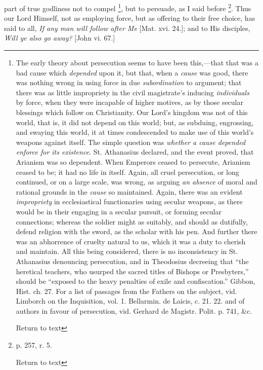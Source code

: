 part of true godliness not to compel \footnote{The early theory about persecution seems to
have been this,—that that was a bad cause which \emph{depended} upon
it, but that, when a \emph{cause} was good, there was nothing wrong in
using force in due \emph{subordination} to argument; that there was as
little impropriety in the civil magistrate's inducing \emph{individuals}
by force, when they were incapable of higher motives, as by those
secular blessings which follow on Christianity. Our Lord's kingdom was
not of this world, that is, it did not depend on this world; but, as
subduing, engrossing, and swaying this world, it at times condescended
to make use of this world's weapons against itself. The simple
question was \emph{whether a cause depended enforce for its existence}.
St. Athanasius declared, and the event proved, that Arianism was so
dependent. When Emperors ceased to persecute, Arianism ceased to be;
it had no life in itself. Again, all cruel persecution, or long
continued, or on a large scale, was wrong, as arguing \emph{an absence}
of moral and rational grounds in the \emph{cause} so maintained.
Again, there was an evident \emph{impropriety} in ecclesiastical
functionaries using secular weapons, as there would be in their
engaging in a secular pursuit, or forming secular connections; whereas
the soldier might as suitably, and should as dutifully, defend
religion with the sword, as the scholar with his pen. And further
there was an abhorrence of cruelty natural to us, which it was a duty
to cherish and maintain. All this being considered, there is no
inconsistency in St. Athanasius denouncing persecution, and in
Theodosius decreeing that ``the heretical teachers, who usurped the
sacred titles of Bishops or Presbyters,'' should be ``exposed to the
heavy penalties of exile and confiscation.'' Gibbon, Hist. ch. 27. For
a list of passages from the Fathers on the subject, vid. Limborch on
the Inquisition, vol. 1. Bellarmin. de Laicis, c. 21. 22. and of
authors in favour of persecution, vid. Gerhard de Magistr. Polit. p.
741, \&c.

Return to text}, but to persuade, as I
said before \footnote{p. 257, r. 5.

Return to text}. Thus our Lord Himself, not as employing force,
but as offering to their free choice, has said to all, \emph{If any man
will follow after Me} [Mat. xvi. 24.]; and to His disciples, \emph{Will
ye also go away?} [John vi. 67.]

